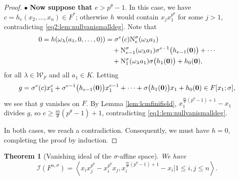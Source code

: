 \documentclass[11pt,reqno]{amsart}
\newtheorem{thm}{Theorem}[section]
\theoremstyle{definition}
\begin{document}
\begin{proof}
\vskip 1mm
\noindent
$\bullet$ {\bf Now suppose that $e>p^\theta-1$}. In this case, we have $c=h_e(x_2,\dots,x_n) \in F^*$; otherwise $h$ would contain $x_jx_1^{p^\theta}$ for some $j>1$, contradicting \eqref{eq2:lem:nullvanismalldeg}. Note that
\begin{align*}
0=h(\omega_\lambda(a_1,0,\dots,0))
&=\sigma^e(c){\rm N}^\sigma_e(\omega_\lambda a_1)\\
&\quad+{\rm N}^\sigma_{e-1}(\omega_\lambda a_1)
  \sigma^{e-1}\big(h_{e-1}({\bf 0})\big)+\cdots\\
&\quad+{\rm N}^\sigma_1(\omega_\lambda a_1)
  \sigma\big(h_1({\bf 0})\big)+h_0({\bf 0}),
\end{align*} for all $\lambda \in \mathscr{W}_{F}$ and all $a_1 \in K$. Letting 
$$g=\sigma^e(c)x_1^e+\sigma^{e-1}\big(h_{e-1}({\bf 0})\big)x_1^{e-1}+\cdots+\sigma\big(h_1({\bf 0})\big)x_1+h_0({\bf 0}) \in F[x_1;\sigma],$$ we see that $g$ vanishes on $F$. By Lemma \ref{lem:lcmfinifield}, $x_1^{\frac{m}{\theta}(p^\theta-1)+1}-x_1$ divides $g$, so $e \geq \frac{m}{\theta}(p^\theta-1)+1$, contradicting \eqref{eq1:lem:nullvanismalldeg}.

In both cases, we reach a contradiction. Consequently, we must have $h=0$, completing the proof by induction.
\end{proof}
\begin{thm}[Vanishing ideal of the $\sigma$-affine space]\label{thm:descrvanide}
We have
\begin{equation}\label{eq:desideasigmfqn}
\mathscr{I}(F^{n,\sigma})=\left\langle x_ix_j^{p^\theta}-x_i^{p^\theta}x_j, x_i^{\frac{m}{\theta}(p^\theta-1)+1}-x_i \bigg\vert 1 \leq i,j \leq n \right\rangle.
\end{equation}
\end{thm}
\end{document}
